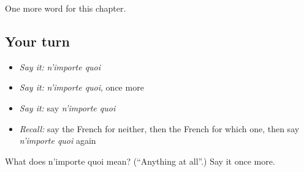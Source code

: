 \begin{grammarlens}[title={What you've built}]
One more word for this chapter.
\end{grammarlens}

\subsection*{Your turn}
\begin{itemize}
\raggedright
  \item \emph{Say it:} \emph{n'importe quoi}
  \item \emph{Say it:} \emph{n'importe quoi}, once more
  \item \emph{Say it:} say \emph{n'importe quoi}
  \item \emph{Recall:} say the French for neither, then the French for which one, then say \emph{n'importe quoi} again
\end{itemize}

\begin{tcolorbox}[breakable,colback=teal!4,colframe=teal!35!black,title={Before you move on}]
What does n'importe quoi mean? (\textquotedblleft{}Anything at all\textquotedblright{}.) Say it once more.
\end{tcolorbox}
